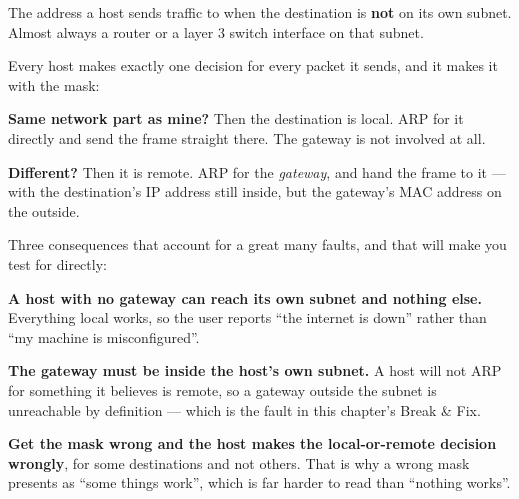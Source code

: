 \begin{definitionbox}
The address a host sends traffic to when the destination is \textbf{not} on its
own subnet. Almost always a router or a layer 3 switch interface on that subnet.

Every host makes exactly one decision for every packet it sends, and it makes it
with the mask:

\begin{tight}
  \item \textbf{Same network part as mine?} Then the destination is local. ARP for
        it directly and send the frame straight there. The gateway is not
        involved at all.
  \item \textbf{Different?} Then it is remote. ARP for the \emph{gateway},
        and hand the frame to it --- with the destination's IP address still
        inside, but the gateway's MAC address on the outside.
\end{tight}

Three consequences that account for a great many faults, and that
 will make you test for directly:

\begin{tight}
  \item \textbf{A host with no gateway can reach its own subnet and nothing
        else.} Everything local works, so the user reports ``the internet is
        down'' rather than ``my machine is misconfigured''.
  \item \textbf{The gateway must be inside the host's own subnet.} A host will
        not ARP for something it believes is remote, so a gateway outside the
        subnet is unreachable by definition --- which is the fault in this
        chapter's Break \& Fix.
  \item \textbf{Get the mask wrong and the host makes the local-or-remote
        decision wrongly}, for some destinations and not others. That is why a
        wrong mask presents as ``some things work'', which is far harder to read
        than ``nothing works''.
\end{tight}
\end{definitionbox}

